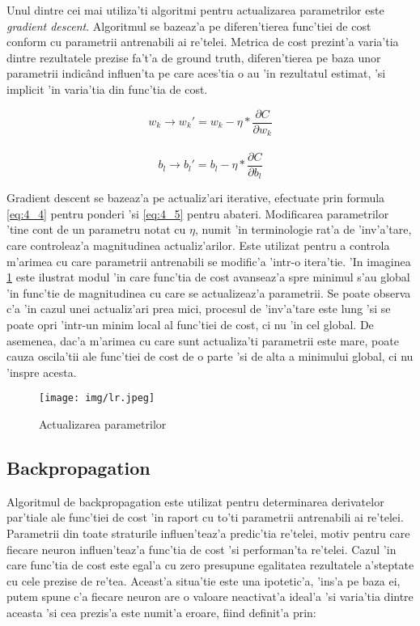 \documentclass[12pt,a4paper,twoside]{report}
\begin{document}
Unul dintre cei mai utiliza'ti algoritmi pentru actualizarea parametrilor este \textit{gradient descent}. Algoritmul se bazeaz'a pe diferen'tierea func'tiei de cost conform cu parametrii antrenabili ai re'telei. Metrica de cost prezint'a varia'tia dintre rezultatele prezise fa't'a de ground truth, diferen'tierea pe baza unor parametrii indic\^and influen'ta pe care aces'tia o au 'in rezultatul estimat, 'si implicit 'in varia'tia din func'tia de cost.

\begin{equation}
w_k \rightarrow w_k\prime= w_k - \eta*\frac{\partial C}{\partial w_k}
\label{eq:4_4}
\end{equation}
\\
\begin{equation}
b_l \rightarrow b_l\prime= b_l - \eta*\frac{\partial C}{\partial b_l}
\label{eq:4_5}
\end{equation}

Gradient descent se bazeaz'a pe actualiz'ari iterative, efectuate prin formula \ref{eq:4_4} pentru ponderi 'si \ref{eq:4_5} pentru abateri. Modificarea parametrilor 'tine cont de un parametru notat cu \textit{$\eta$}, numit 'in terminologie rat'a de 'inv'a'tare, care controleaz'a magnitudinea actualiz'arilor. Este utilizat pentru a controla m'arimea cu care parametrii antrenabili se modific'a 'intr-o itera'tie. 'In imaginea \ref{fig:lr} este ilustrat modul 'in care func'tia de cost avanseaz'a spre minimul s'au global 'in func'tie de magnitudinea cu care se actualizeaz'a parametrii. Se poate observa c'a 'in cazul unei actualiz'ari prea mici, procesul de 'inv'a'tare este lung 'si se poate opri 'intr-un minim local al func'tiei de cost, ci nu 'in cel global. De asemenea, dac'a m'arimea cu care sunt actualiza'ti parametrii este mare, poate cauza oscila'tii ale func'tiei de cost de o parte 'si de alta a minimului global, ci nu 'inspre acesta. 

\begin{figure}[H]
  \centering
  \texttt{[image: img/lr.jpeg]}
  \caption{Actualizarea parametrilor  \protect\footnotemark}
  \label{fig:lr}
\end{figure}

\subsection{Backpropagation}
Algoritmul de backpropagation este utilizat pentru determinarea derivatelor par'tiale ale func'tiei de cost 'in raport cu to'ti parametrii antrenabili ai re'telei. Parametrii din toate straturile influen'teaz'a predic'tia re'telei, motiv pentru care fiecare neuron influen'teaz'a func'tia de cost 'si performan'ta re'telei. Cazul 'in care func'tia de cost este egal'a cu zero presupune egalitatea rezultatele a'steptate cu cele prezise de re'tea. Aceast'a situa'tie este una ipotetic'a, 'ins'a pe baza ei, putem spune c'a fiecare neuron are o valoare neactivat'a ideal'a 'si varia'tia dintre aceasta 'si cea prezis'a este numit'a eroare, fiind definit'a prin:
\end{document}
